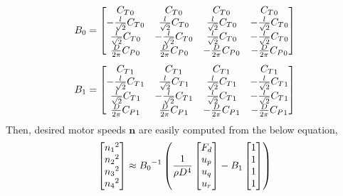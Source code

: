 \begin{equation}
\begin{aligned}
B_0 = 
\begin{bmatrix}
{C_T}_0	& {C_T}_0 	& {C_T}_0		& {C_T}_0 \\
- {l \over{\sqrt{2}}} {C_T}_0		& {l \over{\sqrt{2}}} {C_T}_0		& {l \over{\sqrt{2}}} {C_T}_0	& - {l \over{\sqrt{2}}} {C_T}_0 \\
{l \over{\sqrt{2}}} {C_T}_0		& - {l \over{\sqrt{2}}} {C_T}_0		& {l \over{\sqrt{2}}} {C_T}_0	& - {l \over{\sqrt{2}}} {C_T}_0 \\
{D \over{2\pi}} {C_P}_0			& {D \over{2\pi}} {C_P}_0		& - {D \over{2\pi}} {C_P}_0		& - {D \over{2\pi}} {C_P}_0
\end{bmatrix}
\end{aligned}
\end{equation}
\begin{equation}
\begin{aligned}
B_1 = 
\begin{bmatrix}
{C_T}_1	& {C_T}_1 	& {C_T}_1		& {C_T}_1 \\
- {l \over{\sqrt{2}}} {C_T}_1		& {l \over{\sqrt{2}}} {C_T}_1		& {l \over{\sqrt{2}}} {C_T}_1	& - {l \over{\sqrt{2}}} {C_T}_1 \\
{l \over{\sqrt{2}}} {C_T}_1		& - {l \over{\sqrt{2}}} {C_T}_1		& {l \over{\sqrt{2}}} {C_T}_1	& - {l \over{\sqrt{2}}} {C_T}_1 \\
{D \over{2\pi}} {C_P}_1			& {D \over{2\pi}} {C_P}_1		& - {D \over{2\pi}} {C_P}_1	& - {D \over{2\pi}} {C_P}_1
\end{bmatrix}
\end{aligned}
\end{equation}
Then, desired motor speeds \( \boldsymbol n\) are easily computed from the below equation,
\begin{equation}
\begin{aligned}
\begin{bmatrix}
{n_1}^2 \\
{n_2}^2 \\
{n_3}^2 \\
{n_4}^2
\end{bmatrix}
\approx
{B_0}^{-1}
\left(
{1 \over {\rho D^4}}
\begin{bmatrix}
F_d\\
u_p\\
u_q\\
u_r
\end{bmatrix}
- B_1
\begin{bmatrix}
1\\
1\\
1\\
1
\end{bmatrix}
\right)
\end{aligned}
\end{equation}

